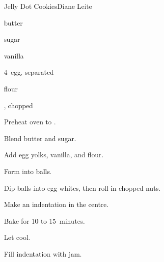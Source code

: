 \begin{recipe}{Jelly Dot Cookies}{Diane Leite}{}

\begin{ingredients}
\item {} butter
\item {} sugar
\item {} vanilla
\item 4~egg, separated
\item {} flour
\item {}, chopped
\item {}
\end{ingredients}

\begin{directions}
\item Preheat oven to .
\item Blend butter and sugar.
\item Add egg yolks, vanilla, and flour.
\item Form into balls.
\item Dip balls into egg whites, then roll in chopped nuts.
\item Make an indentation in the centre.
\item Bake for 10 to 15~minutes.
\item Let cool.
\item Fill indentation with jam.
\end{directions}
\end{recipe}
